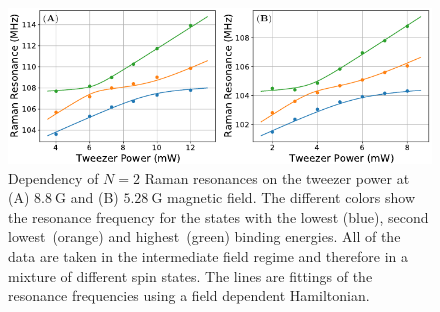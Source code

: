 \begin{figure}
  \centering
  \includegraphics[width=\textwidth]{figures/raman_spectroscopy_n2_fit.pdf}
  \caption[$N=2$ Raman resonances and fitting to external field strengths.]{
    Dependency of $N=2$ Raman resonances on the tweezer power at
    (A) $8.8~\mathrm{G}$ and (B) $5.28~\mathrm{G}$ magnetic field.
    The different colors show the resonance frequency for the states with
    the lowest (blue), second lowest~(orange) and highest~(green) binding energies.
    All of the data are taken in the intermediate field regime
    and therefore in a mixture of different spin states.
    The lines are fittings of the resonance frequencies using a field dependent Hamiltonian.
    \label{fig:raman-spectroscopy:n2-fit}}
\end{figure}

